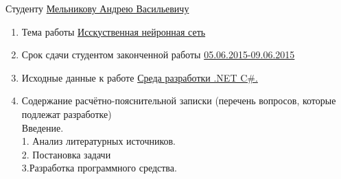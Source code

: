\documentclass[14pt,a4paper]{extreport}
\begin{document}
	\endcenter
	\raggedright
	Студенту \underline{ Мельникову Андрею Васильевичу }\\
	\begin{enumerate}
	\item Тема работы \underline{Исскуственная нейронная сеть}\\ 
	\item Срок сдачи студентом законченной работы \underline{05.06.2015-09.06.2015}
	\item Исходные данные к работе \underline{Среда разработки .NET C\#. }
	\item Содержание расчётно-пояснительной записки (перечень вопросов, которые подлежат разработке)\\
	\underline{\hspace*{16cm}}\hspace*{-16cm}Введение. \\
	
	\underline{\hspace*{16cm}}\hspace*{-16cm}1. Анализ литературных источников.\\
	
	\underline{\hspace*{16cm}}\hspace*{-16cm}2. Постановка задачи\\
	
	\underline{\hspace*{16cm}}\hspace*{-16cm}3.Разработка программного средства. \\
	

\end{enumerate}
\end{document}
